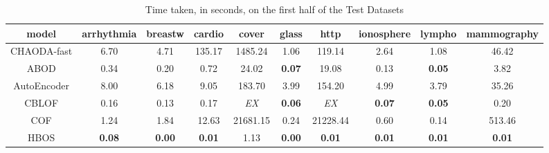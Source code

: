 \begin{table*}[!t]
\renewcommand{\arraystretch}{1.25}
\caption{Time taken, in seconds, on the first half of the Test Datasets}
\label{table:results:test-time-1}
\centering
\begin{tabular}{|c|c|c|c|c|c|c|c|c|c|}
\hline
\textbf{\textbf{model}} & \textbf{\textbf{arrhythmia}} & \textbf{\textbf{breastw}} & \textbf{\textbf{cardio}} & \textbf{\textbf{cover}} & \textbf{\textbf{glass}} & \textbf{\textbf{http}} & \textbf{\textbf{ionosphere}} & \textbf{\textbf{lympho}} & \textbf{\textbf{mammography}} \\
\hline
                CHAODA-fast &                         6.70 &                      4.71 &                   135.17 &                 1485.24 &                    1.06 &                 119.14 &                         2.64 &                     1.08 &                         46.42 \\
\hline
                        ABOD &                         0.34 &                      0.20 &                     0.72 &                   24.02 &           \textbf{0.07} &                  19.08 &                         0.13 &            \textbf{0.05} &                          3.82 \\
\hline
                AutoEncoder &                         8.00 &                      6.18 &                     9.05 &                  183.70 &                    3.99 &                 154.20 &                         4.99 &                     3.79 &                         35.26 \\
\hline
                        CBLOF &                         0.16 &                      0.13 &                     0.17 &             \textit{EX} &           \textbf{0.06} &            \textit{EX} &                \textbf{0.07} &            \textbf{0.05} &                          0.20 \\
\hline
                        COF &                         1.24 &                      1.84 &                    12.63 &                21681.15 &                    0.24 &               21228.44 &                         0.60 &                     0.14 &                        513.46 \\
\hline
                        HBOS &                \textbf{0.08} &             \textbf{0.00} &            \textbf{0.01} &                    1.13 &           \textbf{0.00} &          \textbf{0.01} &                \textbf{0.01} &            \textbf{0.01} &                 \textbf{0.01} \\

\end{tabular}
\end{table*}
